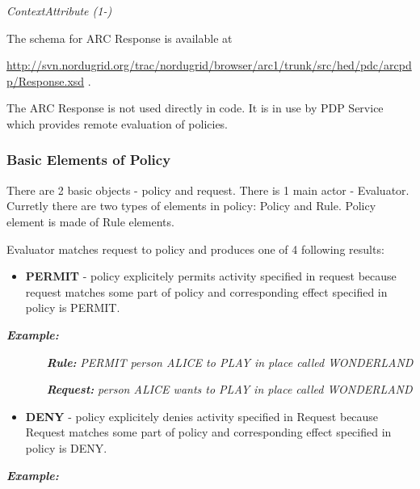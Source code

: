 \documentclass{article}
\newcommand\liststyleWWviiiNumxxi{%
\renewcommand\labelitemi{[F0B7?]}
\renewcommand\labelitemii{o}
\renewcommand\labelitemiii{[F0A7?]}
\renewcommand\labelitemiv{[F0B7?]}
}
\begin{document}
{\itshape\color{black}
   ContextAttribute (1-)}

{\upshape\color{black}
The schema for ARC Response is available at}

{\upshape\color{black}
\url{http://svn.nordugrid.org/trac/nordugrid/browser/arc1/trunk/src/hed/pdc/arcpdp/Response.xsd}
.}

{\upshape\color{black}
The ARC Response is not used directly in code. It is in use by PDP
Service which provides remote evaluation of policies. }

\subsubsection{Basic Elements of Policy}
{\upshape\color{black}
There are 2 basic objects - {\textquotedbl}policy{\textquotedbl} and
{\textquotedbl}request{\textquotedbl}. There is 1 main actor -
Evaluator. Curretly there are two types of elements in policy: Policy
and Rule. Policy element is made of Rule elements.}

{\color{black}
Evaluator matches request to policy and produces one of 4 following
results:}

\liststyleWWviiiNumxxi
\begin{itemize}
\item {\color{black}
\textbf{PERMIT} - policy explicitely permits activity specified in
request because request matches some part of policy and corresponding
effect specified in policy is PERMIT. }
\end{itemize}
{\bfseries\itshape\color{black}
Example: }

{\upshape\color{black}
\textbf{\textit{\ \ \ \ \ \ }}\textbf{\textit{Rule: }}\textit{PERMIT
person ALICE to PLAY in place called WONDERLAND}}

{\upshape\color{black}
\textbf{\textit{\ \ \ \ \ \ }}\textbf{\textit{Request: }}\textit{person
ALICE wants to PLAY in place called WONDERLAND}}

\liststyleWWviiiNumxxi
\begin{itemize}
\item {\color{black}
\textbf{DENY} - policy explicitely denies activity specified in Request
because Request matches some part of policy and corresponding effect
specified in policy is DENY.}
\end{itemize}
{\bfseries\itshape\color{black}
Example:}
\end{document}
